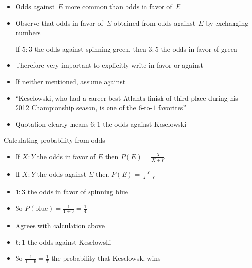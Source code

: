 \documentclass[handout]{beamer}
\theoremstyle{definition}
\begin{document}
\begin{frame}
\begin{itemize}
\item Odds against~$E$ more common than odds in favor of~$E$
\item Observe that odds in favor of~$E$ obtained
from odds against~$E$ by exchanging numbers
\begin{example} If $5:3$ the odds against spinning green,
then $3:5$ the odds in favor of green
\end{example}
\item Therefore very important to explicitly write
\alert{in favor} or \alert{against}
\item If neither mentioned, assume \alert{against}
\end{itemize}
\begin{example}
\begin{itemize}
\item ``Keselowski, who had a career-best Atlanta finish of third-place
during his 2012 Championship season, is one of the \alert{$6$-to-$1$} favorites''
\item Quotation clearly means $6:1$ the odds \alert{against} Keselowski
\end{itemize}
\end{example}
\end{frame}

\begin{frame}{Calculating probability from odds}
\begin{itemize}
\item If $X:Y$ the odds in favor of $E$
then $P\left(E\right)=\frac{X}{X+Y}$
\item If $X:Y$ the odds against $E$
then $P\left(E\right)=\frac{Y}{X+Y}$
\end{itemize}
\begin{example}
\begin{itemize}
\item $1:3$ the odds in favor of spinning blue
\item So $P\left(\text{blue}\right)=\frac{1}{1+3}=\frac{1}{4}$
\item Agrees with calculation above
\end{itemize}
\end{example}
\begin{example}
\begin{itemize}
\item $6:1$ the odds against Keselowski
\item So $\frac{1}{1+6}=\frac{1}{7}$ the probability
that Keselowski wins
\end{itemize}
\end{example}
\end{frame}
\end{document}
